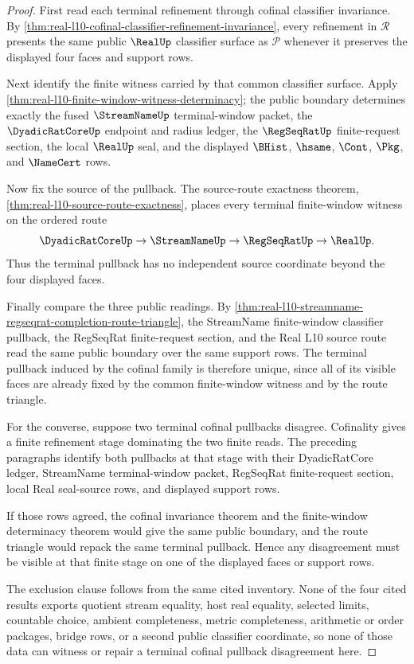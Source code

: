 \begin{proof}
First read each terminal refinement through cofinal classifier invariance. By \autoref{thm:real-l10-cofinal-classifier-refinement-invariance}, every refinement in $\mathcal R$ presents the same public $\RealUp$ classifier surface as $\mathcal P$ whenever it preserves the displayed four faces and support rows.

Next identify the finite witness carried by that common classifier surface. Apply \autoref{thm:real-l10-finite-window-witness-determinacy}; the public boundary determines exactly the fused $\StreamNameUp$ terminal-window packet, the $\DyadicRatCoreUp$ endpoint and radius ledger, the $\RegSeqRatUp$ finite-request section, the local $\RealUp$ seal, and the displayed $\BHist$, $\hsame$, $\Cont$, $\Pkg$, and $\NameCert$ rows.

Now fix the source of the pullback. The source-route exactness theorem, \autoref{thm:real-l10-source-route-exactness}, places every terminal finite-window witness on the ordered route
$$
\DyadicRatCoreUp \to \StreamNameUp \to \RegSeqRatUp \to \RealUp.
$$
Thus the terminal pullback has no independent source coordinate beyond the four displayed faces.

Finally compare the three public readings. By \autoref{thm:real-l10-streamname-regseqrat-completion-route-triangle}, the StreamName finite-window classifier pullback, the RegSeqRat finite-request section, and the Real L10 source route read the same public boundary over the same support rows. The terminal pullback induced by the cofinal family is therefore unique, since all of its visible faces are already fixed by the common finite-window witness and by the route triangle.

For the converse, suppose two terminal cofinal pullbacks disagree. Cofinality gives a finite refinement stage dominating the two finite reads. The preceding paragraphs identify both pullbacks at that stage with their DyadicRatCore ledger, StreamName terminal-window packet, RegSeqRat finite-request section, local Real seal-source rows, and displayed support rows.

If those rows agreed, the cofinal invariance theorem and the finite-window determinacy theorem would give the same public boundary, and the route triangle would repack the same terminal pullback. Hence any disagreement must be visible at that finite stage on one of the displayed faces or support rows.

The exclusion clause follows from the same cited inventory. None of the four cited results exports quotient stream equality, host real equality, selected limits, countable choice, ambient completeness, metric completeness, arithmetic or order packages, bridge rows, or a second public classifier coordinate, so none of those data can witness or repair a terminal cofinal pullback disagreement here.
\end{proof}

